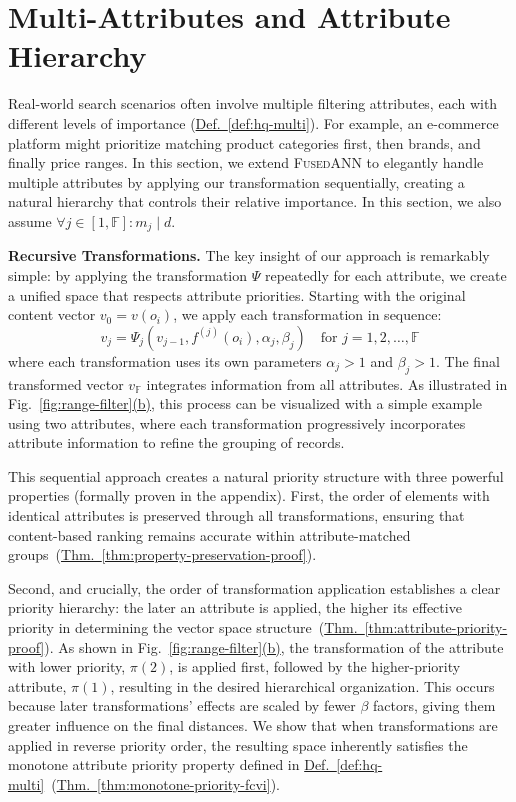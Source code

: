 \documentclass[numbers,sort]{article}
\begin{document}
\section{Multi-Attributes and Attribute Hierarchy}
\label{sec:attr-hierarchy}

Real-world search scenarios often involve multiple filtering attributes, each with different levels of importance (\hyperref[def:hq-multi]{Def.~\ref*{def:hq-multi}}). For example, an e-commerce platform might prioritize matching product categories first, then brands, and finally price ranges. In this section, we extend \textsc{FusedANN} to elegantly handle multiple attributes by applying our transformation sequentially, creating a natural hierarchy that controls their relative importance. In this section, we also assume $\forall j\in[1,\mathbb{F}]: m_j \mid d$.


\textbf{Recursive Transformations.} The key insight of our approach is remarkably simple: by applying the transformation $\Psi$ repeatedly for each attribute, we create a unified space that respects attribute priorities. Starting with the original content vector $v_0 = v(o_i)$, we apply each transformation in sequence:
\begin{equation}
v_j = \Psi_j(v_{j-1}, f^{(j)}(o_i), \alpha_j, \beta_j) \quad \text{for } j = 1, 2, \ldots, \mathbb{F}
\end{equation}
where each transformation uses its own parameters $\alpha_j > 1$ and $\beta_j > 1$. The final transformed vector $v_{\mathbb{F}}$ integrates information from all attributes.
As illustrated in Fig.~\hyperref[fig:range-filter]{\ref*{fig:range-filter}(b)}, this process can be visualized with a simple example using two attributes, where each transformation progressively incorporates attribute information to refine the grouping of records.

This sequential approach creates a natural priority structure with three powerful properties (formally proven in the appendix). First, the order of elements with identical attributes is preserved through all transformations, ensuring that content-based ranking remains accurate within attribute-matched groups~(\hyperref[thm:property-preservation-proof]{Thm.~\ref*{thm:property-preservation-proof}}).

Second, and crucially, the order of transformation application establishes a clear priority hierarchy: the later an attribute is applied, the higher its effective priority in determining the vector space structure~(\hyperref[thm:attribute-priority-proof]{Thm.~\ref*{thm:attribute-priority-proof}}). As shown in Fig.~\hyperref[fig:range-filter]{\ref*{fig:range-filter}(b)},  the transformation of the attribute with lower priority, $\pi(2)$, is applied first, followed by the higher-priority attribute, $\pi(1)$, resulting in the desired hierarchical organization. This occurs because later transformations' effects are scaled by fewer $\beta$ factors, giving them greater influence on the final distances. We show that when transformations are applied in reverse priority order, the resulting space inherently satisfies the monotone attribute priority property defined in \hyperref[def:hq-multi]{Def.~\ref*{def:hq-multi}}~(\hyperref[thm:monotone-priority-fcvi]{Thm.~\ref*{thm:monotone-priority-fcvi}}).
\end{document}
